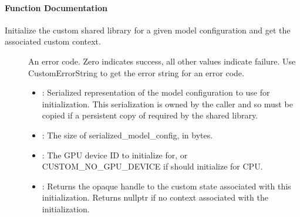 \documentclass[letterpaper,10pt,english]{sphinxmanual}
\begin{document}
\paragraph{Function Documentation}
\label{\detokenize{cpp_api/function_custom_8h_1ad384f6af9bfb11b82b2b4e411f799b6f:function-documentation}}

\begin{fulllineitems}
\label{\detokenize{cpp_api/function_custom_8h_1ad384f6af9bfb11b82b2b4e411f799b6f:_CPPv416CustomInitializePKc6size_tiPPv}}%
\pysigstartmultiline
{}\label{\detokenize{cpp_api/function_custom_8h_1ad384f6af9bfb11b82b2b4e411f799b6f:custom_8h_1ad384f6af9bfb11b82b2b4e411f799b6f}}%
\pysigstopmultiline
Initialize the custom shared library for a given model configuration and get the associated custom context. 

\begin{description}
\item[{}] \leavevmode
An error code. Zero indicates success, all other values indicate failure. Use CustomErrorString to get the error string for an error code. 

\item[{}] \leavevmode\begin{itemize}
\item {} 
: Serialized representation of the model configuration to use for initialization. This serialization is owned by the caller and so must be copied if a persistent copy of required by the shared library. 

\item {} 
: The size of serialized\_model\_config, in bytes. 

\item {} 
: The GPU device ID to initialize for, or CUSTOM\_NO\_GPU\_DEVICE if should initialize for CPU. 

\item {} 
: Returns the opaque handle to the custom state associated with this initialization. Returns nullptr if no context associated with the initialization. 

\end{itemize}

\end{description}


\end{fulllineitems}
\end{document}

